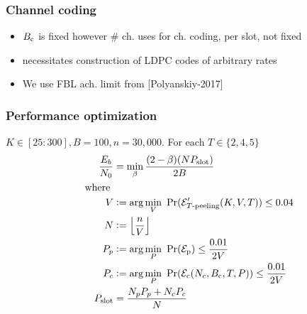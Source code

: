 \begin{frame}
\frametitle{Channel coding}
\begin{itemize}
\item $B_{\mathrm{c}}$ is fixed however $\#$ ch. uses for ch. coding, per slot, not fixed
\item necessitates construction of LDPC codes of arbitrary rates 
\item We use FBL ach. limit from [Polyanskiy-2017]
\end{itemize}
\end{frame}
\begin{frame}\frametitle{Performance optimization}
$K\in[25:300], B=100, n=30,000$. For each $T\in\{2,4,5\}$
\begin{align*}
\frac{E_b}{N_0}&=\min_{\beta} \frac{(2-\beta)(N  P_{\text{slot}})}{2B}\\
\text{ ~~where }&\\
V&\mathrel{\mathop:}= \arg\min_{V}~\Pr(\mathcal{E}'_{T\text{-peeling}}(K,V,T))\leq 0.04\\
N&\mathrel{\mathop:}=\left\lfloor \frac{n}{V}\right\rfloor\\
P_p&\mathrel{\mathop:}= \arg\min_{P}~ \Pr(\mathcal{E}_{\mathrm{p}})\leq \frac{0.01}{2V}\\
P_c&\mathrel{\mathop:}= \arg\min_{P}~\Pr(\mathcal{E}_{\mathrm{c}} (N_c,B_\mathrm{c},T,P))\leq \frac{0.01}{2V}\\
P_{\text{slot}}&=\frac{N_p P_p+ N_c P_c}{N}
\end{align*}
\end{frame}

\begin{frame}
\centering
\resizebox{0.7\textwidth}{!}{}
\end{frame}

